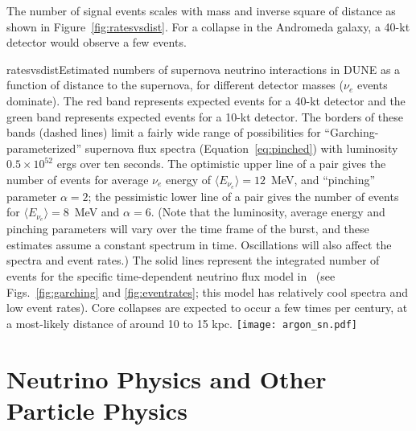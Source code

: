The number of signal events scales with mass and inverse square of distance as shown in Figure~\ref{fig:ratesvsdist}.  For a collapse in the Andromeda galaxy, a 40-kt detector would observe a few events.

\begin{cdrfigure}{ratesvsdist}{Estimated numbers of supernova neutrino interactions in DUNE as a function of distance to the supernova, for different detector masses ($\nu_e$ events dominate). The red band 
represents expected events for a 40-kt detector and the green band represents expected events for a 10-kt detector. The borders of these bands (dashed lines) limit a fairly wide range of possibilities for ``Garching-parameterized'' supernova flux spectra (Equation~\ref{eq:pinched}) with luminosity $0.5\times 10^{52}$ ergs over ten seconds. The optimistic upper line of a pair gives the number of events for average $\nu_e$ energy of $\langle E_{\nu_e}\rangle =12$~MeV, and ``pinching'' parameter $\alpha=2$; the pessimistic lower line of a pair gives the number of events for $\langle E_{\nu_e}\rangle=8$~MeV and $\alpha=6$. (Note that the luminosity, average energy and pinching parameters will vary over the time frame of the burst, and these estimates assume a constant spectrum in time. Oscillations will also affect the spectra and event rates.) The solid lines represent the integrated number of events for the specific time-dependent neutrino flux model in~\cite{Huedepohl:2009wh} (see Figs.~\ref{fig:garching} and \ref{fig:eventrates}; this model has relatively cool spectra and low event rates). Core collapses are expected to occur a few times per century, at a most-likely distance of around 10 to 15 kpc.}
\texttt{[image: argon\_sn.pdf]}
\end{cdrfigure}



\section{Neutrino Physics and Other Particle Physics}
\label{sec:physics-snblowe-neutrino-physics}

